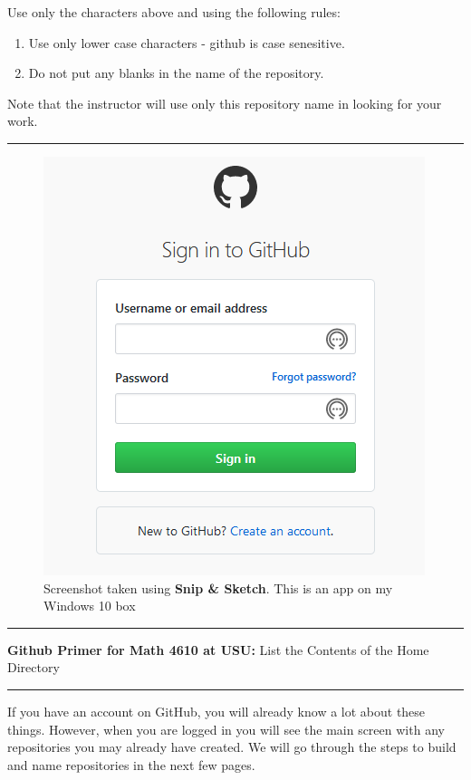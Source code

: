 \documentclass[10pt,fleqn]{article}
\begin{document}
Use only the characters above and using the following rules:
\begin{enumerate}
  \item Use only lower case characters - github is case senesitive.
  \item Do not put any blanks in the name of the repository.
\end{enumerate}
Note that the instructor will use only this repository name in looking for your
work.
\vskip0.1in\hrule\vskip0.1in
\vfill
\begin{figure}[h]
\centering
\includegraphics{../images/github_02.png}
\caption{{Screenshot} taken using {\bf Snip \& Sketch}. This is an app on
         my Windows 10 box}
\end{figure}
\eject
\vskip0.1in\hrule\vskip0.1in
\noindent
{{\bf Github Primer for Math 4610 at USU:} List the Contents of the Home
    Directory} 
\vskip0.1in\hrule\vskip0.1in
\noindent
If you have an account on GitHub, you will already know a lot about these
things. However, when you are logged in you will see the main screen with any
repositories you may already have created. We will go through the steps to
build and name repositories in the next few pages.
\end{document}

